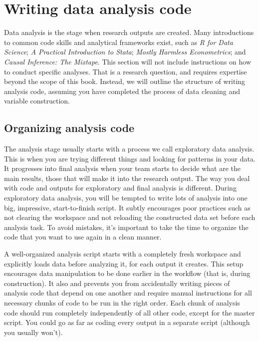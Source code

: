 
\section{Writing data analysis code}

Data analysis is the stage when research outputs are created.
Many introductions to common code skills and analytical frameworks exist, such as
\textit{R for Data Science};
\textit{A Practical Introduction to Stata};
\textit{Mostly Harmless Econometrics};
and \textit{Causal Inference: The Mixtape}.
This section will not include instructions on how to conduct specific analyses.
That is a research question, and requires expertise beyond the scope of this book.
Instead, we will outline the structure of writing analysis code,
assuming you have completed the process of data cleaning and variable construction.

\subsection{Organizing analysis code}

The analysis stage usually starts with a process we call exploratory data analysis.
This is when you are trying different things and looking for patterns in your data.
It progresses into final analysis when your team starts to decide what are the main results,
those that will make it into the research output.
The way you deal with code and outputs for exploratory and final analysis is different.
During exploratory data analysis,
you will be tempted to write lots of analysis into one big, impressive, start-to-finish script.
It subtly encourages poor practices such as not clearing the workspace and not reloading the constructed data set before each analysis task.
To avoid mistakes, it's important to take the time
to organize the code that you want to use again in a clean manner.

A well-organized analysis script starts with a completely fresh workspace
and explicitly loads data before analyzing it, for each output it creates.
This setup encourages data manipulation to be done earlier in the workflow
(that is, during construction).
It also and prevents you from accidentally writing pieces of analysis code that depend on one another
and require manual instructions for all necessary chunks of code to be run in the right order.
Each chunk of analysis code should run completely independently of all other code,
except for the master script.
You could go as far as coding every output in a separate script (although you usually won't).

